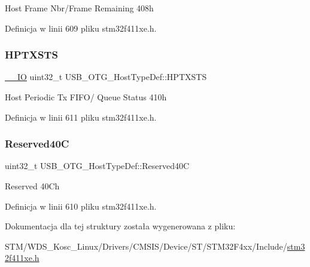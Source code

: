 Host Frame Nbr/\+Frame Remaining 408h 

Definicja w linii 609 pliku stm32f411xe.\+h.

\mbox{\label{struct_u_s_b___o_t_g___host_type_def_af095d2e3da9e07f63ed7da99276eaaca}} 
\subsubsection{\texorpdfstring{H\+P\+T\+X\+S\+TS}{HPTXSTS}}
{\footnotesize\ttfamily \hyperlink{core__sc300_8h_aec43007d9998a0a0e01faede4133d6be}{\+\_\+\+\_\+\+IO} uint32\+\_\+t U\+S\+B\+\_\+\+O\+T\+G\+\_\+\+Host\+Type\+Def\+::\+H\+P\+T\+X\+S\+TS}

Host Periodic Tx F\+I\+F\+O/ Queue Status 410h 

Definicja w linii 611 pliku stm32f411xe.\+h.

\mbox{\label{struct_u_s_b___o_t_g___host_type_def_a0d4a262443e6d12c065adcafabf787ee}} 
\subsubsection{\texorpdfstring{Reserved40C}{Reserved40C}}
{\footnotesize\ttfamily uint32\+\_\+t U\+S\+B\+\_\+\+O\+T\+G\+\_\+\+Host\+Type\+Def\+::\+Reserved40C}

Reserved 40\+Ch 

Definicja w linii 610 pliku stm32f411xe.\+h.



Dokumentacja dla tej struktury została wygenerowana z pliku\+:\begin{DoxyCompactItemize}
\item 
S\+T\+M/\+W\+D\+S\+\_\+\+Kosc\+\_\+\+Linux/\+Drivers/\+C\+M\+S\+I\+S/\+Device/\+S\+T/\+S\+T\+M32\+F4xx/\+Include/\hyperlink{stm32f411xe_8h}{stm32f411xe.\+h}\end{DoxyCompactItemize}
